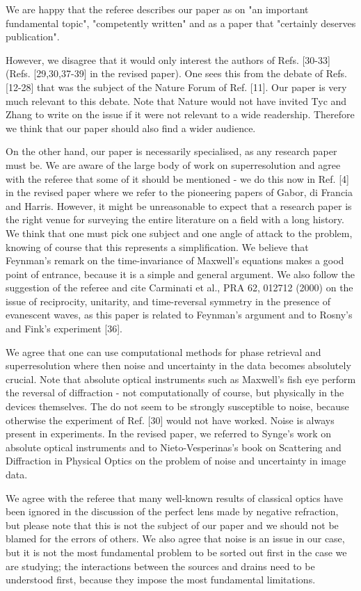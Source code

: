 We are happy that the referee describes our paper as on "an important fundamental topic", "competently written" and as a paper that "certainly deserves publication". 

However, we disagree that it would only interest the authors of Refs. [30-33] (Refs. [29,30,37-39] in the revised paper). One sees this from the debate of Refs. [12-28] that was the subject of the Nature Forum of Ref. [11]. Our paper is very much relevant to this debate. Note that Nature would not have invited Tyc and Zhang to write on the issue if it were not relevant to a wide readership. Therefore we think that our paper should also find a wider audience. 

On the other hand, our paper is necessarily specialised, as any research paper must be. We are aware of the large body of work on superresolution and agree with the referee that some of it should be mentioned - we do this now in Ref. [4] in the revised paper where we refer to the pioneering papers of Gabor, di Francia and Harris. However, it might be unreasonable to expect that a research paper is the right venue for surveying the entire literature on a field with a long history. We think that one must pick one subject and one angle of attack to the problem, knowing of course that this represents a simplification. We believe that Feynman's remark on the time-invariance of Maxwell's equations makes a good point of entrance, because it is a simple and general argument. We also follow the suggestion of the referee and cite Carminati et al., PRA 62, 012712 (2000) on the issue of reciprocity, unitarity, and time-reversal symmetry in the presence of evanescent waves, as this paper is related to Feynman's argument and to Rosny's and Fink's experiment [36]. 

We agree that one can use computational methods for phase retrieval and superresolution where then noise and uncertainty in the data becomes absolutely crucial. Note that absolute optical instruments such as Maxwell's fish eye perform the reversal of diffraction - not computationally of course, but physically in the devices themselves. The do not seem to be strongly susceptible to noise, because otherwise the experiment of Ref. [30] would not have worked. Noise is always present in experiments. In the revised paper, we referred to Synge's work on absolute optical instruments and to Nieto-Vesperinas's book on Scattering and Diffraction in Physical Optics on the problem of noise and uncertainty in image data. 

We agree with the referee that many well-known results of classical optics have been ignored in the discussion of the perfect lens made by negative refraction, but please note that this is not the subject of our paper and we should not be blamed for the errors of others. We also agree that noise is an issue in our case, but it is not the most fundamental problem to be sorted out first in the case we are studying; the interactions between the sources and drains need to be understood first, because they impose the most fundamental limitations. 

